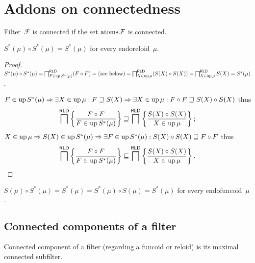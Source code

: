 \chapter{Addons on connectedness}

\begin{conjecture}
Filter~$\mathcal{F}$ is connected if the set
$\operatorname{atoms}\mathcal{F}$ is connected.
\end{conjecture}

\begin{thm}
  $S^{\ast} (\mu) \circ S^{\ast} (\mu) = S^{\ast} (\mu)$
  for every endoreloid~$\mu$.
\end{thm}

\begin{proof}
  $S^{\ast} (\mu) \circ S^{\ast} (\mu) = \bigsqcap^{\mathsf{RLD}}_{F
  \in \operatorname{up} S^{\ast} (\mu)} (F \circ F) = \text{(see below)} =
  \bigsqcap^{\mathsf{RLD}}_{X \in \operatorname{up} \mu} (S (X) \circ S (X)) =
  \bigsqcap^{\mathsf{RLD}}_{X \in \operatorname{up} \mu} S (X) = S^{\ast}
  (\mu)$.
  
  $F \in \operatorname{up} S^{\ast} (\mu) \Rightarrow \exists X \in \operatorname{up} \mu : F
  \sqsupseteq S (X) \Rightarrow \exists X \in \operatorname{up} \mu : F \circ F
  \sqsupseteq S (X) \circ S (X)$ thus
  \[ \bigsqcap^{\mathsf{RLD}} \left\{ \frac{ F \circ F}{
     F \in \operatorname{up} S^{\ast} (\mu) }\right\} \sqsupseteq
     \bigsqcap^{\mathsf{RLD}} \left\{ \frac{ S (X) \circ S (X) }{ X \in \operatorname{up} \mu }\right\} ; \]
  $X \in \operatorname{up} \mu \Rightarrow S (X) \in \operatorname{up} S^{\ast} (\mu)
  \Rightarrow \exists F \in \operatorname{up} S^{\ast} (\mu) : S (X) \circ S (X)
  \sqsupseteq F \circ F$ thus
  \[ \bigsqcap^{\mathsf{RLD}} \left\{ \frac{ F \circ F }{
     F \in \operatorname{up} S^{\ast} (\mu) }\right\} \sqsubseteq
     \bigsqcap^{\mathsf{RLD}} \left\{ \frac{ S (X) \circ S (X) }{ X \in \operatorname{up} \mu }\right\} . \]
\end{proof}

\begin{cor}
$S (\mu) \circ S^{\ast} (\mu) = S^{\ast} (\mu) =
S^{\ast} (\mu) \circ S (\mu) = S^{\ast} (\mu)$
for every endofuncoid~$\mu$.
\end{cor}

\section{Connected components of a filter}

\begin{defn}
Connected component of a filter (regarding a funcoid or reloid)
is its maximal connected subfilter.
\end{defn}


